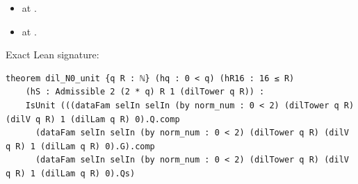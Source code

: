 \begin{theorem}[bp-093]
\begin{itemize}
\item \texttt{} at \texttt{}.
\item \texttt{} at \texttt{}.
\end{itemize}
\par Exact Lean signature:
\begin{verbatim}
theorem dil_N0_unit {q R : ℕ} (hq : 0 < q) (hR16 : 16 ≤ R)
    (hS : Admissible 2 (2 * q) R 1 (dilTower q R)) :
    IsUnit (((dataFam selIn selIn (by norm_num : 0 < 2) (dilTower q R) (dilV q R) 1 (dilLam q R) 0).Q.comp
      (dataFam selIn selIn (by norm_num : 0 < 2) (dilTower q R) (dilV q R) 1 (dilLam q R) 0).G).comp
      (dataFam selIn selIn (by norm_num : 0 < 2) (dilTower q R) (dilV q R) 1 (dilLam q R) 0).Qs)
\end{verbatim}
\end{theorem}

